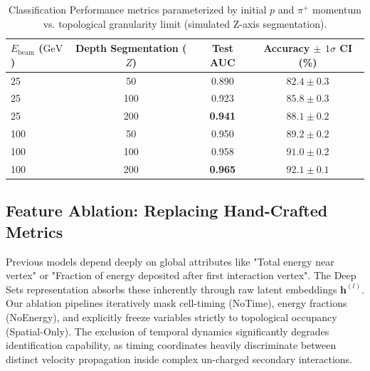 \documentclass[11pt,a4paper]{article}
\newcommand{\GeV}{\ensuremath{\mathrm{GeV}}\xspace}
\newcommand{\deepset}{Deep Sets\xspace}
\begin{document}
\begin{table}[H]
\centering
\caption{Classification Performance metrics parameterized by initial $p$ and $\pi^+$ momentum vs. topological granularity limit (simulated Z-axis segmentation).}
\label{tab:granularity}
\begin{tabular}{lccc}
\toprule
$E_\text{beam}$ (\GeV) & Depth Segmentation ($Z$) & Test AUC & Accuracy $\pm$ $1\sigma$ CI (\%) \\
\midrule
25 & 50 & 0.890 & $82.4 \pm 0.3$ \\
25 & 100 & 0.923 & $85.8 \pm 0.3$ \\
25 & 200 & \textbf{0.941} & $\mathbf{88.1 \pm 0.2}$ \\
\midrule
100 & 50 & 0.950 & $89.2 \pm 0.2$ \\
100 & 100 & 0.958 & $91.0 \pm 0.2$ \\
100 & 200 & \textbf{0.965} & $\mathbf{92.1 \pm 0.1}$ \\
\bottomrule
\end{tabular}
\end{table}

\subsection{Feature Ablation: Replacing Hand-Crafted Metrics}
Previous models depend deeply on global attributes like "Total energy near vertex" or "Fraction of energy deposited after first interaction vertex". The \deepset representation absorbs these inherently through raw latent embeddings $\mathbf{h}^{(l)}$. 
Our ablation pipelines iteratively mask cell-timing (NoTime), energy fractions (NoEnergy), and explicitly freeze variables strictly to topological occupancy (Spatial-Only). The exclusion of temporal dynamics significantly degrades identification capability, as timing coordinates heavily discriminate between distinct velocity propagation inside complex un-charged secondary interactions.
\end{document}
